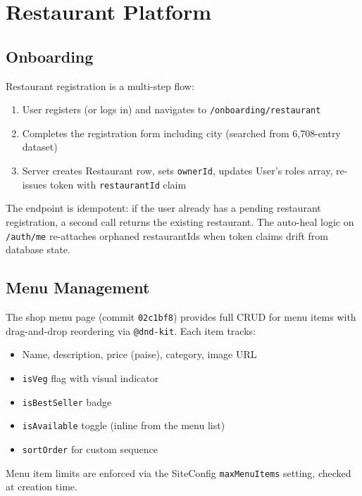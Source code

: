 \documentclass[11pt,a4paper,twoside]{book}
\begin{document}
\chapter{Restaurant Platform}

\section{Onboarding}

Restaurant registration is a multi-step flow:

\begin{enumerate}[leftmargin=1.5em]
  \item User registers (or logs in) and navigates to \texttt{/onboarding/restaurant}
  \item Completes the registration form including city (searched from 6,708-entry dataset)
  \item Server creates Restaurant row, sets \texttt{ownerId}, updates User's roles array, re-issues token with \texttt{restaurantId} claim
\end{enumerate}

The endpoint is idempotent: if the user already has a pending restaurant
registration, a second call returns the existing restaurant.  The auto-heal
logic on \texttt{/auth/me} re-attaches orphaned restaurantIds when token claims
drift from database state.

\section{Menu Management}

The shop menu page (commit \texttt{02c1bf8}) provides full CRUD for menu items
with drag-and-drop reordering via \texttt{@dnd-kit}.  Each item tracks:

\begin{itemize}[leftmargin=1.4em,nosep]
  \item Name, description, price (paise), category, image URL
  \item \texttt{isVeg} flag with visual indicator
  \item \texttt{isBestSeller} badge
  \item \texttt{isAvailable} toggle (inline from the menu list)
  \item \texttt{sortOrder} for custom sequence
\end{itemize}

Menu item limits are enforced via the SiteConfig \texttt{maxMenuItems} setting,
checked at creation time.
\end{document}
